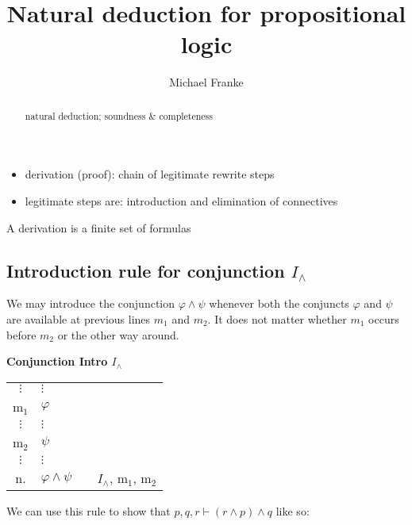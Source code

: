 \documentclass[nobib,nofonts]{tufte-handout}
\title{Natural deduction for propositional logic}
\author[M.~Franke]{Michael Franke}
\date{} %
\begin{document}
\maketitle

\begin{abstract}
\noindent
natural deduction; soundness \& completeness
\end{abstract}

\begin{itemize}
  \item derivation (proof): chain of legitimate rewrite steps
  \item legitimate steps are: introduction and elimination of connectives
\end{itemize}

A derivation is a finite set of formulas


\newpage

\subsection{Introduction rule for conjunction $I_{\wedge}$}

We may introduce the conjunction $\varphi \wedge \psi$ whenever both the conjuncts $\varphi$ and $\psi$ are available at previous lines $m_{1}$ and $m_{2}$. It does not matter whether $m_{1}$ occurs before $m_{2}$ or the other way around.

\bigskip
\noindent \colorbox{mygray!60}{\centering
  \begin{minipage}[t]{0.35\linewidth}
    \textbf{Conjunction Intro $I_{\wedge}$}
  \end{minipage}
  \begin{minipage}[t]{0.55\linewidth}
    \begin{tabular}{clcl}
      $\vdots$ & $\vdots$ & \\
      m$_{1}$ & $\varphi$  &  \\
      $\vdots$ & $\vdots$ & \\
      m$_{2}$ & $\psi$ & \\
      $\vdots$ & $\vdots$ & \\
      n. & $\varphi \wedge \psi$ & & $I_{\wedge}$, m$_{1}$, m$_{2}$
    \end{tabular}
  \end{minipage}
}
\bigskip

We can use this rule to show that $p, q, r \vdash (r \wedge p) \wedge q$ like so:
\end{document}
